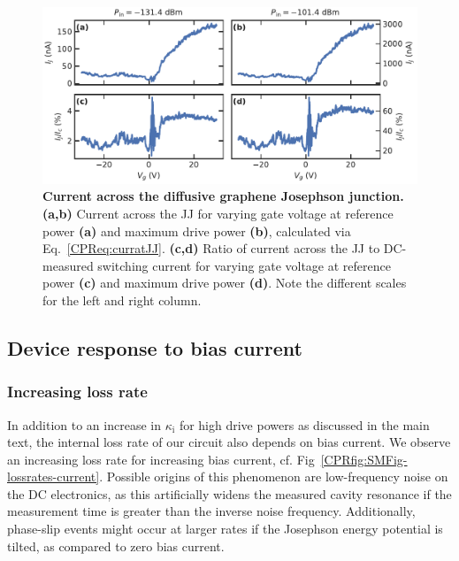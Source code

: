 \begin{figure}
	\centering
	\includegraphics[width=\linewidth]{chapter-gJJ-CPR/figs/SMFigure-curratJJ}
	\caption{
		\textbf{Current across the diffusive graphene Josephson junction.}
		\textbf{(a,b)} Current across the JJ for varying gate voltage at reference power \textbf{(a)} and maximum drive power \textbf{(b)}, calculated via Eq.~\ref{CPReq:curratJJ}.
		\textbf{(c,d)} Ratio of current across the JJ to DC-measured switching current for varying gate voltage at reference power \textbf{(c)} and maximum drive power \textbf{(d)}.
		Note the different scales for the left and right column.
	}
	\label{CPRfig:SMFigcurratJJ}
\end{figure}

\subsection{Device response to bias current}\label{sec:SMfitbiascurrent}
\subsubsection{Increasing loss rate}
In addition to an increase in $\kappa_\text{i}$ for high drive powers as discussed in the main text, the internal loss rate of our circuit also depends on bias current.
%
We observe an increasing loss rate for increasing bias current, cf. Fig~\ref{CPRfig:SMFig-lossrates-current}.
%
Possible origins of this phenomenon are low-frequency noise on the DC electronics, as this artificially widens the measured cavity resonance if the measurement time is greater than the inverse noise frequency.
%
Additionally, phase-slip events might occur at larger rates if the Josephson energy potential is tilted, as compared to zero bias current.

